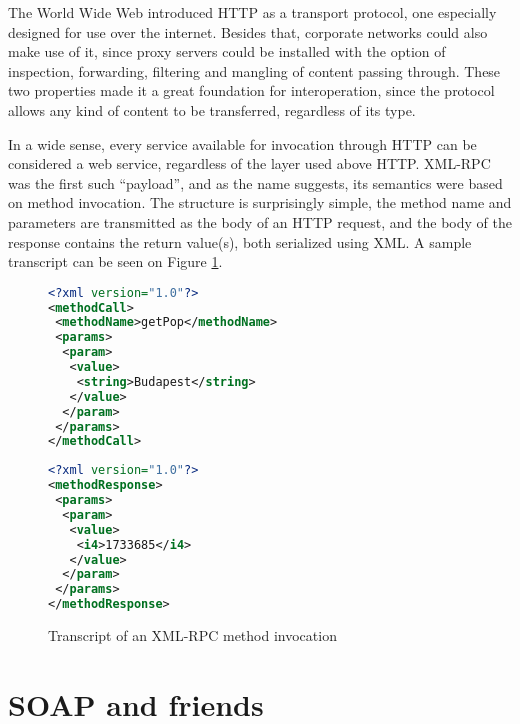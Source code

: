 The World Wide Web introduced HTTP as a transport protocol, one especially designed for use over the internet. Besides that, corporate networks could also make use of it, since proxy servers could be installed with the option of inspection, forwarding, filtering and mangling of content passing through. These two properties made it a great foundation for interoperation, since the protocol allows any kind of content to be transferred, regardless of its type.

In a wide sense, every service available for invocation through HTTP can be considered a web service, regardless of the layer used above HTTP. XML-RPC was the first such ``payload'', and as the name suggests, its semantics were based on method invocation. The structure is surprisingly simple, the method name and parameters are transmitted as the body of an HTTP request, and the body of the response contains the return value(s), both serialized using XML. A sample transcript can be seen on Figure \ref{fig:xmlrpc-sample}.

\begin{figure}[htbp]
 \centering
 \begin{minipage}[t]{0.56\linewidth}
  \centering
  \begin{lstlisting}[language=XML, numbers=off]
<?xml version="1.0"?>
<methodCall>
 <methodName>getPop</methodName>
 <params>
  <param>
   <value>
    <string>Budapest</string>
   </value>
  </param>
 </params>
</methodCall>
  \end{lstlisting}
 \end{minipage}
 \hspace{0.5cm}
 \begin{minipage}[t]{0.37\linewidth}
  \centering
  \begin{lstlisting}[language=XML, numbers=off]
<?xml version="1.0"?>
<methodResponse>
 <params>
  <param>
   <value>
    <i4>1733685</i4>
   </value>
  </param>
 </params>
</methodResponse>
  \end{lstlisting}
 \end{minipage}
 \caption{Transcript of an XML-RPC method invocation}
 \label{fig:xmlrpc-sample}
\end{figure}

\section{SOAP and friends}

